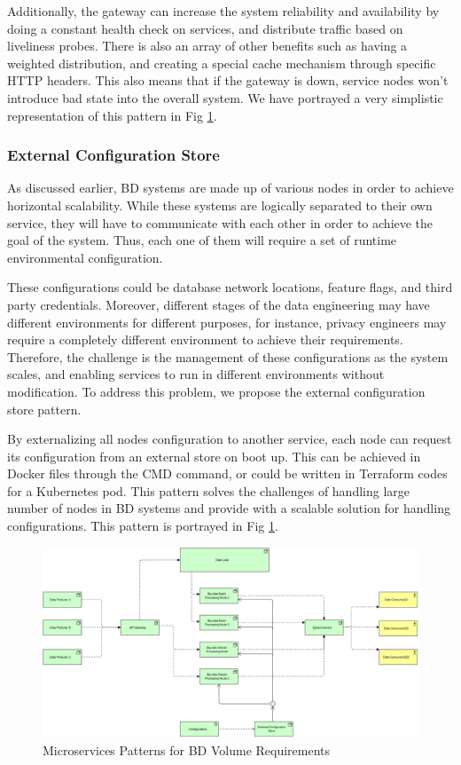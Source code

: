 \documentclass{bmcart}
\begin{document}
Additionally, the gateway can increase the system reliability and availability by doing a constant health check on services, and distribute traffic based on liveliness probes. There is also an array of other benefits such as having a weighted distribution, and creating a special cache mechanism through specific HTTP headers. This also means that if the gateway is down, service nodes won't introduce bad state into the overall system. We have portrayed a very simplistic representation of this pattern in Fig \ref{fig:VolReq}. 

\subsubsection{External Configuration Store}

As discussed earlier, BD systems are made up of various nodes in order to achieve horizontal scalability. While these systems are logically separated to their own service, they will have to communicate with each other in order to achieve the goal of the system. Thus, each one of them will require a set of runtime environmental configuration. 

These configurations could be database network locations, feature flags, and third party credentials. Moreover, different stages of the data engineering may have different environments for different purposes, for instance, privacy engineers may require a completely different environment to achieve their requirements. Therefore, the challenge is the management of these configurations as the system scales, and enabling services to run in different environments without modification. To address this problem, we propose the external configuration store pattern.

By externalizing all nodes configuration to another service, each node can request its configuration from an external store on boot up. This can be achieved in Docker files through the CMD command, or could be written in Terraform codes for a Kubernetes pod. This pattern solves the challenges of handling large number of nodes in BD systems and provide with a scalable solution for handling configurations. This pattern is portrayed in Fig \ref{fig:VolReq}.

\begin{figure}[h]
    \centering 
    \includegraphics[width=12cm]{Media/Vol-1 Requirement RA.jpg}
    \caption{Microservices Patterns for BD Volume Requirements}
    \label{fig:VolReq}
\end{figure}
\end{document}
